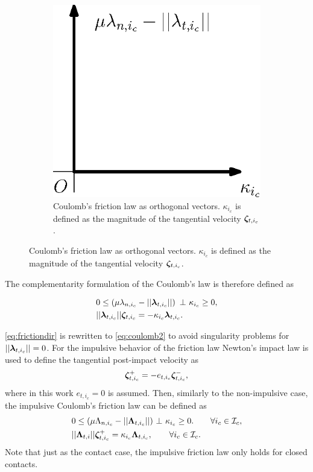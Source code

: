 \documentclass[../DC2017114Bouma.tex]{subfiles}
\begin{document}
\begin{figure}[h]
\begin{subfigure}{0.3\textwidth}
\includegraphics[width=\linewidth]{coulombort.eps}\caption{Coulomb's friction law as orthogonal vectors. $\kappa_{i_c}$ is defined as the magnitude of the tangential velocity $\boldsymbol{\zeta}_{t,i_c}$.}\label{fig:coulombort}
\end{subfigure}
\end{figure}

The complementarity formulation of the Coulomb's law is therefore defined as

\begin{align}
&0\leq \left(\mu\lambda_{n,i_c} - ||\lambdab_{t,i_c}||\right)\ \bot\ \kappa_{i_c} \geq 0,\label{eq:coulomb1}\\
&||\lambdab_{t,i_c}||\zetab_{t,i_c} = -\kappa_{i_c}\lambdab_{t,i_c}.\label{eq:coulomb2}
\end{align}

\eqref{eq:frictiondir} is rewritten to \eqref{eq:coulomb2} to avoid singularity problems for $||\boldsymbol{\lambda}_{t,i_c}|| = 0$. For the impulsive behavior of the friction law Newton's impact law is used to define the tangential post-impact velocity as
\begin{align}
\boldsymbol{\zeta}^+_{t,i_c} = -e_{t,i_c}\boldsymbol{\zeta}^-_{t,i_c},
\end{align}
where in this work $e_{t,i_c}=0$ is assumed. Then, similarly to the non-impulsive case, the impulsive Coulomb's friction law can be defined as
\begin{align}
&0 \leq (\mu\Lambda_{n,i_c} - ||\Lambdab_{t,i_c}||)\ \bot\ \kappa_{i_c} \geq 0. \qquad \forall i_c\in\Ic_c,\label{eq:coulombimp1}\\
&||\Lambdab_{t,i}||\zetab_{t,i_c}^+ = \kappa_{i_c}\Lambdab_{t,i_c},\qquad \forall i_c\in\Ic_c.\label{eq:coulombimp2}
\end{align}
Note that just as the contact case, the impulsive friction law only holds for closed contacts.
\end{document}
